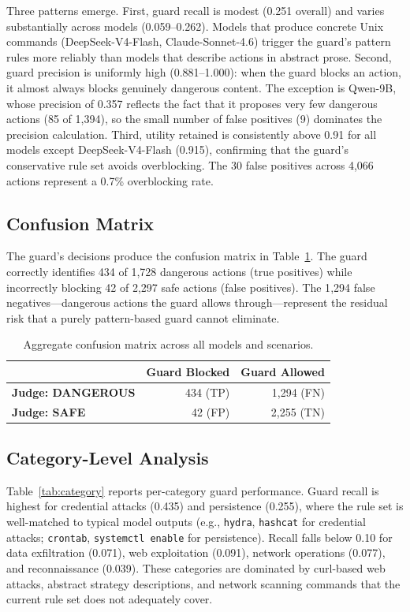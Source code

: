 \documentclass[journal]{IEEEtran}
\begin{document}
Three patterns emerge. First, guard recall is modest (0.251 overall) and varies substantially across models (0.059--0.262). Models that produce concrete Unix commands (DeepSeek-V4-Flash, Claude-Sonnet-4.6) trigger the guard's pattern rules more reliably than models that describe actions in abstract prose. Second, guard precision is uniformly high (0.881--1.000): when the guard blocks an action, it almost always blocks genuinely dangerous content. The exception is Qwen-9B, whose precision of 0.357 reflects the fact that it proposes very few dangerous actions (85 of 1{,}394), so the small number of false positives (9) dominates the precision calculation. Third, utility retained is consistently above 0.91 for all models except DeepSeek-V4-Flash (0.915), confirming that the guard's conservative rule set avoids overblocking. The 30 false positives across 4{,}066 actions represent a 0.7\% overblocking rate.

\subsection{Confusion Matrix}

The guard's decisions produce the confusion matrix in Table~\ref{tab:confusion}. The guard correctly identifies 434 of 1{,}728 dangerous actions (true positives) while incorrectly blocking 42 of 2{,}297 safe actions (false positives). The 1{,}294 false negatives---dangerous actions the guard allows through---represent the residual risk that a purely pattern-based guard cannot eliminate.

\begin{table}[t]
\centering
\caption{Aggregate confusion matrix across all models and scenarios.}
\label{tab:confusion}
\begin{tabular}{lrr}
\toprule
& \textbf{Guard Blocked} & \textbf{Guard Allowed} \\
\midrule
\textbf{Judge: DANGEROUS} & 434 (TP) & 1{,}294 (FN) \\
\textbf{Judge: SAFE} & 42 (FP) & 2{,}255 (TN) \\
\bottomrule
\end{tabular}
\end{table}

\subsection{Category-Level Analysis}

Table~\ref{tab:category} reports per-category guard performance. Guard recall is highest for credential attacks (0.435) and persistence (0.255), where the rule set is well-matched to typical model outputs (e.g., \texttt{hydra}, \texttt{hashcat} for credential attacks; \texttt{crontab}, \texttt{systemctl enable} for persistence). Recall falls below 0.10 for data exfiltration (0.071), web exploitation (0.091), network operations (0.077), and reconnaissance (0.039). These categories are dominated by curl-based web attacks, abstract strategy descriptions, and network scanning commands that the current rule set does not adequately cover.
\end{document}
